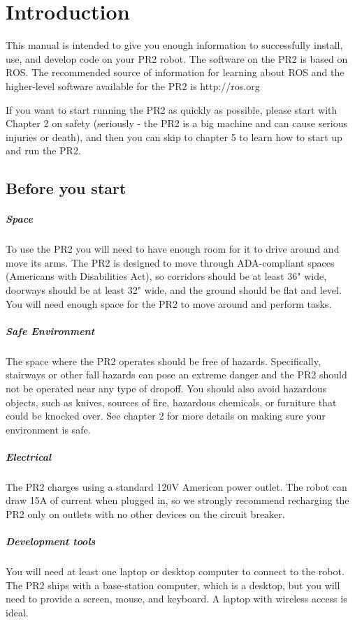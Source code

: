 \chapter {Introduction}
This manual is intended to give you enough information to successfully install, use, and develop code on your PR2 robot.  The software on the PR2 is based on ROS.  The recommended source of information for learning about ROS and the higher-level software available for the PR2 is http://ros.org

If you want to start running the PR2 as quickly as possible, please start with Chapter 2 on safety (seriously - the PR2 is a big machine and can cause serious injuries or death), and then you can skip to chapter 5 to learn how to start up and run the PR2.

\section{Before you start}
\paragraph{Space} To use the PR2 you will need to have enough room for it to drive around and move its arms.  The PR2 is designed to move through ADA-compliant spaces (Americans with Disabilities Act), so corridors should be at least 36" wide, doorways should be at least 32" wide, and the ground should be flat and level.  You will need enough space for the PR2 to move around and perform tasks.
\paragraph{Safe Environment} The space where the PR2 operates should be free of hazards.  Specifically, stairways or other fall hazards can pose an extreme danger and the PR2 should not be operated near any type of dropoff.  You should also avoid hazardous objects, such as knives, sources of fire, hazardous chemicals, or furniture that could be knocked over.  See chapter 2 for more details on making sure your environment is safe.
\paragraph{Electrical} The PR2 charges using a standard 120V American power outlet.  The robot can draw 15A of current when plugged in, so we strongly recommend recharging the PR2 only on outlets with no other devices on the circuit breaker.
\paragraph{Development tools}
You will need at least one laptop or desktop computer to connect to the robot.  The PR2 ships with a base-station computer, which is a desktop, but you will need to provide a screen, mouse, and keyboard.  A laptop with wireless access is ideal.
